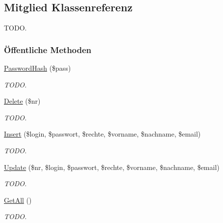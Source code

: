 \hypertarget{classMitglied}{
\subsection{Mitglied Klassenreferenz}
\label{classMitglied}
}
TODO.  


\subsubsection*{\"{O}ffentliche Methoden}
\begin{CompactItemize}
\item 
\hyperlink{classMitglied_9b13db80866c22bf992e73f2eb75e369}{Password\-Hash} (\$pass)
\begin{CompactList}\small\item\em TODO. \item\end{CompactList}\item 
\hyperlink{classMitglied_c6900c12663e9b228bf9942fc045b8b4}{Delete} (\$nr)
\begin{CompactList}\small\item\em TODO. \item\end{CompactList}\item 
\hyperlink{classMitglied_a856527798258505adf9eb08b79fd9fc}{Insert} (\$login, \$passwort, \$rechte, \$vorname, \$nachname, \$email)
\begin{CompactList}\small\item\em TODO. \item\end{CompactList}\item 
\hyperlink{classMitglied_0d173487bebdd0579a70ea007b37b5ec}{Update} (\$nr, \$login, \$passwort, \$rechte, \$vorname, \$nachname, \$email)
\begin{CompactList}\small\item\em TODO. \item\end{CompactList}\item 
\hyperlink{classMitglied_70ce63c9c9a7159966dc9e80a7f726a2}{Get\-All} ()
\begin{CompactList}\small\item\em TODO. \item\end{CompactList}\end{CompactItemize}
